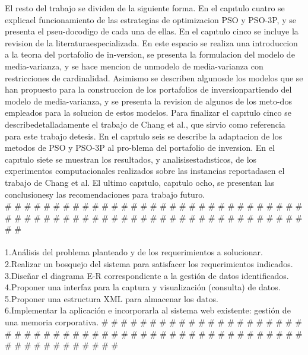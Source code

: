 El  resto  del  trabajo  se  dividen  de  la  siguiente  forma.  En  el  capıtulo  cuatro  se  explicael funcionamiento de las estrategias de optimizacion PSO y PSO-3P, y se presenta el pseu-docodigo  de  cada  una  de  ellas.  En  el  capıtulo  cinco  se  incluye  la  revision  de  la  literaturaespecializada.  En  este  espacio  se  realiza  una  introduccion  a  la  teorıa  del  portafolio  de  in-version, se presenta la formulacion del modelo de media-varianza, y se hace mencion de unmodelo de media-varianza con restricciones de cardinalidad. Asimismo se describen algunosde  los  modelos  que  se  han  propuesto  para  la  construccion  de  los  portafolios  de  inversionpartiendo del modelo de media-varianza, y se presenta la revision de algunos de los meto-dos empleados para la solucion de estos modelos. Para finalizar el capıtulo cinco se describedetalladamente el trabajo de Chang et al., que sirvio como referencia para este trabajo detesis. En el capıtulo seis se describe la adaptacion de los metodos de PSO y PSO-3P al pro-blema del portafolio de inversion. En el capıtulo siete se muestran los resultados, y analisisestadısticos, de los experimentos computacionales realizados sobre las instancias reportadasen el trabajo de Chang et al. El ultimo capıtulo, capıtulo ocho, se presentan las conclusionesy las recomendaciones para trabajo futuro.\\
\# \# \# \# \# \# \# \# \# \# \# \# \# \# \# \# \# \# \# \# \# \# \# \# \# \# \# \# \# \# \# \# \# \# \# \# \# \# \# \# \# \# \# \# \# \# \# \# \# \# \# \# \# \# \# \# \# \# \# \# \# \# \# \#\\\\
1.Análisis del problema planteado y de los requerimientos a solucionar.\\
2.Realizar un bosquejo del sistema para satisfacer los requerimientos indicados.\\
3.Diseñar el diagrama E-R correspondiente a la gestión de datos identificados.\\
4.Proponer una interfaz para la captura y visualización (consulta)  de datos.\\
5.Proponer una estructura XML para almacenar los datos.\\
6.Implementar  la  aplicación  e  incorporarla  al  sistema  web  existente:  gestión  de  una  memoria corporativa.
\# \# \# \# \# \# \# \# \# \# \# \# \# \# \# \# \# \# \# \# \# \# \# \# \# \# \# \# \# \# \# \# \# \# \# \# \# \# \# \# \# \# \# \# \# \# \# \# \# \# \# \# \# \# \# \# \# \# \# \# \# \# \# \#\\\\
